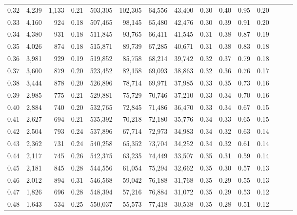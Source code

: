 \begin{tabular}{rrrrrrrrrrrrrrr}
0.32 &   4,239 &  1,133 &  0.21 &  503,305 &  102,305 &   64,556 &   43,400 &  0.30 &  0.40 &  0.95 &      0.20 \\
0.33 &   4,160 &    924 &  0.18 &  507,465 &   98,145 &   65,480 &   42,476 &  0.30 &  0.39 &  0.91 &      0.20 \\
0.34 &   4,380 &    931 &  0.18 &  511,845 &   93,765 &   66,411 &   41,545 &  0.31 &  0.38 &  0.87 &      0.19 \\
0.35 &   4,026 &    874 &  0.18 &  515,871 &   89,739 &   67,285 &   40,671 &  0.31 &  0.38 &  0.83 &      0.18 \\
0.36 &   3,981 &    929 &  0.19 &  519,852 &   85,758 &   68,214 &   39,742 &  0.32 &  0.37 &  0.79 &      0.18 \\
0.37 &   3,600 &    879 &  0.20 &  523,452 &   82,158 &   69,093 &   38,863 &  0.32 &  0.36 &  0.76 &      0.17 \\
0.38 &   3,444 &    878 &  0.20 &  526,896 &   78,714 &   69,971 &   37,985 &  0.33 &  0.35 &  0.73 &      0.16 \\
0.39 &   2,985 &    775 &  0.21 &  529,881 &   75,729 &   70,746 &   37,210 &  0.33 &  0.34 &  0.70 &      0.16 \\
0.40 &   2,884 &    740 &  0.20 &  532,765 &   72,845 &   71,486 &   36,470 &  0.33 &  0.34 &  0.67 &      0.15 \\
0.41 &   2,627 &    694 &  0.21 &  535,392 &   70,218 &   72,180 &   35,776 &  0.34 &  0.33 &  0.65 &      0.15 \\
0.42 &   2,504 &    793 &  0.24 &  537,896 &   67,714 &   72,973 &   34,983 &  0.34 &  0.32 &  0.63 &      0.14 \\
0.43 &   2,362 &    731 &  0.24 &  540,258 &   65,352 &   73,704 &   34,252 &  0.34 &  0.32 &  0.61 &      0.14 \\
0.44 &   2,117 &    745 &  0.26 &  542,375 &   63,235 &   74,449 &   33,507 &  0.35 &  0.31 &  0.59 &      0.14 \\
0.45 &   2,181 &    845 &  0.28 &  544,556 &   61,054 &   75,294 &   32,662 &  0.35 &  0.30 &  0.57 &      0.13 \\
0.46 &   2,012 &    894 &  0.31 &  546,568 &   59,042 &   76,188 &   31,768 &  0.35 &  0.29 &  0.55 &      0.13 \\
0.47 &   1,826 &    696 &  0.28 &  548,394 &   57,216 &   76,884 &   31,072 &  0.35 &  0.29 &  0.53 &      0.12 \\
0.48 &   1,643 &    534 &  0.25 &  550,037 &   55,573 &   77,418 &   30,538 &  0.35 &  0.28 &  0.51 &      0.12 \\

\end{tabular}
